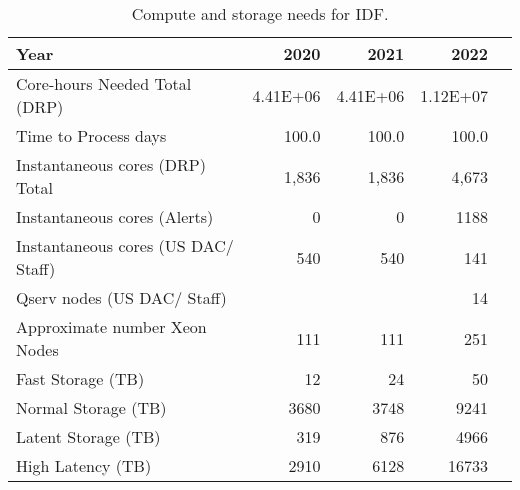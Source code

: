 \tiny \begin{longtable} { |p{}  |r  |r  |r  |r |} 
\caption{Compute and storage needs for IDF. \label{tab:idfneeds}}\\ 
\hline 
\textbf{Year}&\textbf{2020}&\textbf{2021}&\textbf{2022} \\ \hline
{Core-hours Needed Total (DRP)}&{4.41E+06}&{4.41E+06}&{1.12E+07} \\ \hline
{Time to Process days}&{100.0}&{100.0}&{100.0} \\ \hline
{Instantaneous cores (DRP) Total}&{1,836}&{1,836}&{4,673} \\ \hline
{Instantaneous cores (Alerts)}&{0}&{0}&{1188} \\ \hline
{Instantaneous cores (US DAC/ Staff)}&{540}&{540}&{141} \\ \hline
{Qserv nodes (US DAC/ Staff)}&{}&{}&{14} \\ \hline
{Approximate number Xeon Nodes}&{111}&{111}&{251} \\ \hline
{Fast Storage (TB)}&{12}&{24}&{50} \\ \hline
{Normal Storage (TB)}&{3680}&{3748}&{9241} \\ \hline
{Latent Storage  (TB)}&{319}&{876}&{4966} \\ \hline
{High Latency (TB)}&{2910}&{6128}&{16733} \\ \hline
\end{longtable} \normalsize

